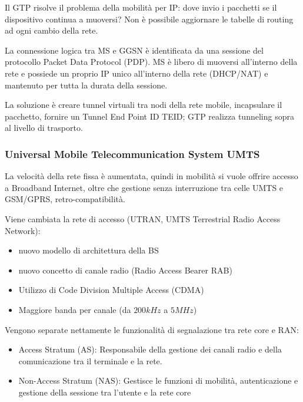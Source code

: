 Il GTP risolve il problema della mobilità per IP: dove invio i pacchetti se il dispositivo continua a muoversi? Non è possibile aggiornare le tabelle di routing ad ogni cambio della rete. 

La connessione logica tra MS e GGSN è identificata da una sessione del protocollo Packet Data Protocol (PDP). MS è libero di muoversi all'interno della rete e possiede un proprio IP unico all'interno della rete (DHCP/NAT) e mantenuto per tutta la durata della sessione.

La soluzione è creare tunnel virtuali tra nodi della rete mobile, incapsulare il pacchetto, fornire un Tunnel End Point ID TEID; GTP realizza tunneling sopra al livello di trasporto. 

\subsubsection{Universal Mobile Telecommunication System UMTS}

La velocità della rete fissa è aumentata, quindi in mobilità si vuole offrire accesso a Broadband Internet, oltre che gestione senza interruzione tra celle UMTS e GSM/GPRS, retro-compatibilità.

Viene cambiata la rete di accesso (UTRAN, UMTS Terrestrial Radio Access Network):
\begin{itemize}
	\item nuovo modello di architettura della BS

	\item nuovo concetto di canale radio (Radio Access Bearer RAB)

	\item Utilizzo di Code Division Multiple Access (CDMA)

	\item Maggiore banda per canale (da $200kHz$ a $5MHz$)
\end{itemize}

Vengono separate nettamente le funzionalità di segnalazione tra rete core e RAN:
\begin{itemize}
	\item Access Stratum (AS): Responsabile della gestione dei canali radio e della comunicazione tra il terminale e la rete.

	\item Non-Access Stratum (NAS): Gestisce le funzioni di mobilità, autenticazione e gestione della sessione tra l'utente e la rete core
\end{itemize}


